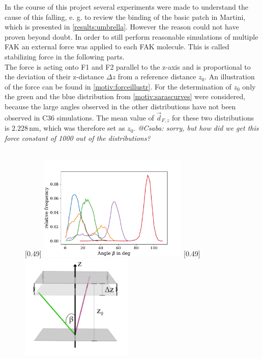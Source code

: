 In the course of this project several experiments were made to understand the cause of this falling, e. g. to review the binding of the basic patch in Martini, which is presented in \autoref{results:umbrella}. However the reason could not have proven beyond doubt. In order to still perform reasonable simulations of multiple FAK an external force was applied to each FAK molecule. This is called stabilizing force in the following parts.\\
The force is acting onto F1 and F2 parallel to the z-axis and is proportional to the deviation of their z-distance $\Delta z$ from a reference distance $z_0$. An illustration of the force can be found in \autoref{motiv:forceillustr}. For the determination of $z_0$ only the green and the blue distribution from \autoref{motiv:sarascurves} were considered, because the large angles observed in the other distributions have not been observed in C36 simulations. The mean value of $\vec{d}_{F, z}$ for these two distributions is $2.228\,\si{\nano\metre}$, which was therefore set as $z_0$. %
\textit{@Csaba: sorry, but how did we get this force constant of 1000 out of the distributions?}\\
\\
%
%
%
\begin{figure}
	\subcaptionbox{\label{motiv:sarascurves}}[0.49\textwidth]{
		\includegraphics[height=5cm]{figures/introduction/sara_angles}
	}\hfill%
	\subcaptionbox{\label{motiv:forceillustr}}[0.49\textwidth]{
		\includegraphics[height=5cm]{figures/introduction/forceapproach}
	}%
\end{figure}
